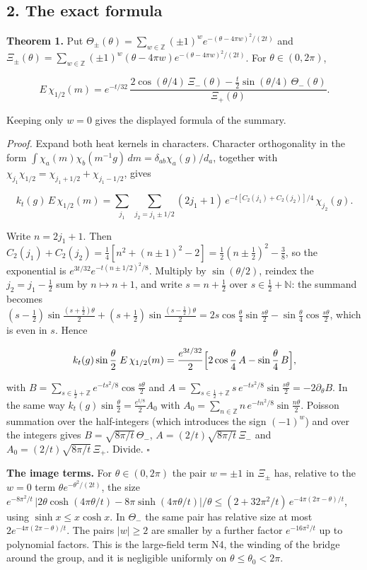 \documentclass[11pt,a4paper]{article}
\begin{document}
\hypertarget{the-exact-formula}{%
\subsection{2. The exact formula}\label{the-exact-formula}}

\textbf{Theorem 1.} Put
\(\Theta_\pm(\theta)=\sum_{w\in\mathbb Z}(\pm1)^w e^{-(\theta-4\pi w)^2/(2t)}\)
and
\(\Xi_\pm(\theta)=\sum_{w\in\mathbb Z}(\pm1)^w(\theta-4\pi w) e^{-(\theta-4\pi w)^2/(2t)}\).
For \(\theta\in(0,2\pi)\),

\[E\,\chi_{1/2}(m)=e^{-t/32}\,
\frac{2\cos(\theta/4)\,\Xi_-(\theta)-\frac t2\sin(\theta/4)\,\Theta_-(\theta)}
{\Xi_+(\theta)}. \tag{1}\]

Keeping only \(w=0\) gives the displayed formula of the summary.

\emph{Proof.} Expand both heat kernels in characters. Character
orthogonality in the form
\(\int\chi_a(m)\chi_b(m^{-1}g)\,dm=\delta_{ab}\chi_a(g)/d_a\), together
with \(\chi_{j_1}\chi_{1/2}=\chi_{j_1+1/2}+\chi_{j_1-1/2}\), gives

\[k_t(g)\,E\,\chi_{1/2}(m)=\sum_{j_1}\ \sum_{j_2=j_1\pm1/2}(2j_1+1)\,
e^{-t[C_2(j_1)+C_2(j_2)]/4}\,\chi_{j_2}(g).\]

Write \(n=2j_1+1\). Then
\(C_2(j_1)+C_2(j_2)=\frac14[n^2+(n\pm1)^2-2] =\frac12(n\pm\frac12)^2-\frac38\),
so the exponential is \(e^{3t/32}e^{-t(n\pm1/2)^2/8}\). Multiply by
\(\sin(\theta/2)\), reindex the \(j_2=j_1-\frac12\) sum by
\(n\mapsto n+1\), and write \(s=n+\frac12\) over
\(s\in\frac12+\mathbb N\): the summand becomes
\((s-\frac12)\sin\frac{(s+\frac12)\theta}2+(s+\frac12)\sin\frac{(s-\frac12)\theta}2 =2s\cos\frac\theta4\sin\frac{s\theta}2-\sin\frac\theta4\cos\frac{s\theta}2\),
which is even in \(s\). Hence

\[k_t(g)\sin\frac\theta2\;E\,\chi_{1/2}(m)=\frac{e^{3t/32}}2
\Bigl[2\cos\frac\theta4\,A-\sin\frac\theta4\,B\Bigr],\]

with \(B=\sum_{s\in\frac12+\mathbb Z}e^{-ts^2/8}\cos\frac{s\theta}2\)
and
\(A=\sum_{s\in\frac12+\mathbb Z}s\,e^{-ts^2/8}\sin\frac{s\theta}2=-2\partial_\theta B\).
In the same way \(k_t(g)\sin\frac\theta2=\frac{e^{t/8}}2A_0\) with
\(A_0=\sum_{n\in\mathbb Z}n\,e^{-tn^2/8}\sin\frac{n\theta}2\). Poisson
summation over the half-integers (which introduces the sign \((-1)^w\))
and over the integers gives \(B=\sqrt{8\pi/t}\,\Theta_-\),
\(A=(2/t)\sqrt{8\pi/t}\,\Xi_-\) and \(A_0=(2/t)\sqrt{8\pi/t}\,\Xi_+\).
Divide. \(\square\)

\textbf{The image terms.} For \(\theta\in(0,2\pi)\) the pair \(w=\pm1\)
in \(\Xi_\pm\) has, relative to the \(w=0\) term
\(\theta e^{-\theta^2/(2t)}\), the size
\(e^{-8\pi^2/t}\,|2\theta\cosh(4\pi\theta/t)-8\pi\sinh(4\pi\theta/t)|/\theta \le(2+32\pi^2/t)\,e^{-4\pi(2\pi-\theta)/t}\),
using \(\sinh x\le x\cosh x\). In \(\Theta_-\) the same pair has
relative size at most \(2e^{-4\pi(2\pi-\theta)/t}\). The pairs
\(|w|\ge2\) are smaller by a further factor \(e^{-16\pi^2/t}\) up to
polynomial factors. This is the large-field term N4, the winding of the
bridge around the group, and it is negligible uniformly on
\(\theta\le\theta_0<2\pi\).
\end{document}
